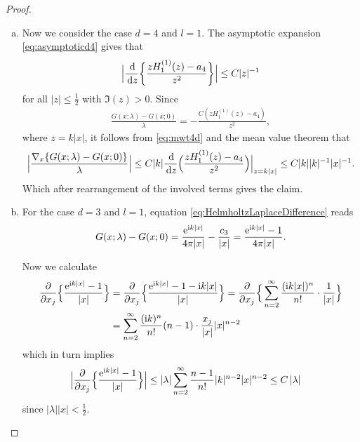 \begin{proof}
\begin{enumerate}[(a)]
  \item Now we consider the case $d = 4$ and $l = 1$.
    The asymptotic expansion \eqref{eq:asymptoticd4} gives that
    \begin{align}
      \label{eq:mwt4d}
      \Big| \frac{\, {\operatorname{d}\!{}}}{\, {\operatorname{d}\!{z}}} \bigg\{ \frac{z H_1^{(1)}(z) - a_4}{z^2} \bigg\} \Big| \leq C |z|^{-1}
    \end{align}
    for all $|z| \leq \frac{1}{2}$ with $\Im(z) > 0$.
    Since
    \begin{align*}
      \frac{G(x; \lambda) - G(x; 0)}{\lambda} = - \frac{C (z H_1^{(1)}(z) - a_4)}{z^2},
    \end{align*}
    where $z = k |x|$, it follows from \eqref{eq:mwt4d} and the mean value theorem that
    \begin{align*}
      \Big|\frac{\nabla_x \{ G(x; \lambda) - G(x; 0) \}}{\lambda} \Big|
      \leq C |k| \frac{\, {\operatorname{d}\!{}}}{\, {\operatorname{d}\!{z}}} \Big( \frac{z H_1^{(1)}(z) - a_4}{z^2} \Big) \Big|_{z = k|x|}
      \leq C |k| |k|^{-1} |x|^{-1}.
    \end{align*}
    Which after rearrangement of the involved terms gives the claim.

  \item For the case $d = 3$ and $l = 1$, equation \eqref{eq:HelmholtzLaplaceDifference} reads
    \begin{align*}
      G(x;\lambda) - G(x; 0) = \frac{\mathrm{e}^{\mathrm{i} k |x|}}{4\pi |x|} - \frac{c_3}{|x|} = \frac{\mathrm{e}^{\mathrm{i} k|x|} - 1}{4 \pi |x|}.
    \end{align*}

    Now we calculate
    \begin{align*}
      \frac{\partial}{\partial x_j} \Big\{ \frac{\mathrm{e}^{\mathrm{i} k|x|} - 1}{|x|} \Big\} 
      &= \frac{\partial}{\partial x_j} \Big\{ \frac{\mathrm{e}^{\mathrm{i} k |x|} - 1 - \mathrm{i} k |x|}{|x|} \Big\} 
      = \frac{\partial}{\partial x_j} \Big\{ \sum_{n = 2}^\infty \frac{(\mathrm{i} k |x|)^n}{n!} \cdot \frac{1}{|x|} \Big\} \\
      &= \sum_{n = 2}^\infty \frac{(\mathrm{i} k)^n}{n!} (n - 1) \cdot \frac{x_j}{|x|} |x|^{n - 2} 
    \end{align*}
    which in turn implies 
    \begin{align*}
      \Big| \frac{\partial}{\partial x_j} \Big\{ \frac{\mathrm{e}^{\mathrm{i} k |x|} - 1}{|x|} \Big\} \Big|
      &\leq |\lambda| \sum_{n = 2}^\infty \frac{n - 1}{n!} |k|^{n - 2} |x|^{n - 2} 
      \leq C \, |\lambda|
    \end{align*}
    since $|\lambda||x| < \frac{1}{2}$.


\end{enumerate}
\end{proof}
